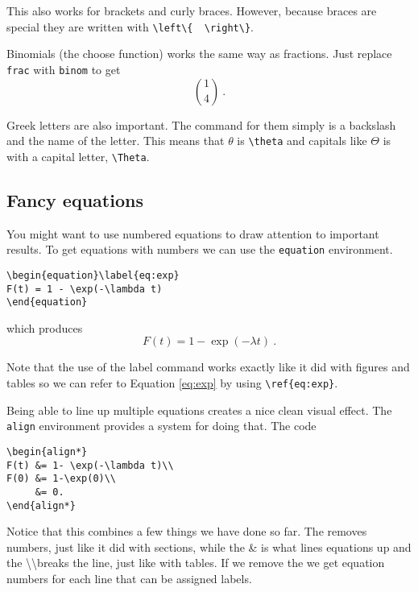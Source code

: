 This also works for brackets and curly braces. However, because braces are special they are written with \verb|\left\{  \right\}|.

Binomials (the choose function) works the same way as fractions. Just replace \texttt{frac} with \texttt{binom} to get
$$\binom{1}{4}\ .$$

Greek letters are also important. The command for them simply is a backslash and the name of the letter. This means that $\theta$ is \verb|\theta| and capitals like $\Theta$ is with a capital letter, \verb|\Theta|.


\subsection{Fancy equations}

You might want to use numbered equations to draw attention to important results. To get equations with numbers we can use the \texttt{equation} environment.

\begin{lstlisting}
\begin{equation}\label{eq:exp}
F(t) = 1 - \exp(-\lambda t)
\end{equation}
\end{lstlisting}

which produces 
\begin{equation}\label{eq:exp}
F(t) = 1 - \exp(-\lambda t)\ .
\end{equation}

Note that the use of the label command works exactly like it did with figures and tables so we can refer to Equation \ref{eq:exp} by using \verb|\ref{eq:exp}|.

Being able to line up multiple equations creates a nice clean visual effect. The \texttt{align} environment provides a system for doing that. The code

\begin{lstlisting}
\begin{align*}
F(t) &= 1- \exp(-\lambda t)\\
F(0) &= 1-\exp(0)\\
     &= 0.
\end{align*}
\end{lstlisting}

Notice that this combines a few things we have done so far. The \* removes numbers, just like it did with sections, while the \& is what lines equations up and the \textbackslash\textbackslash breaks the line, just like with tables. If we remove the \* we get equation numbers for each line that can be assigned labels.

